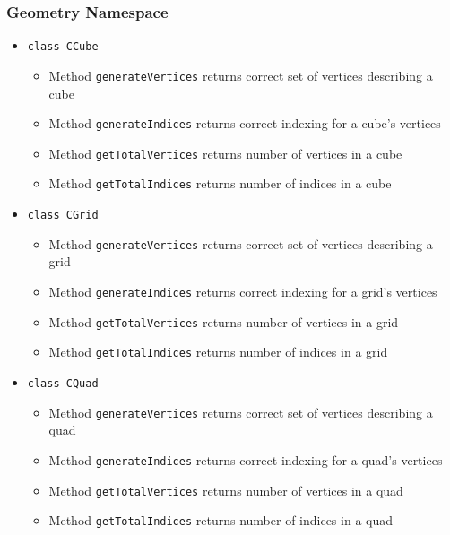 \documentclass{report}
\begin{document}
\subsubsection{Geometry Namespace}
\begin{itemize}

%
%	
\item \texttt{class CCube}
		\begin{itemize}
			\item Method \texttt{generateVertices} returns correct set of vertices describing a cube
			\item Method \texttt{generateIndices} returns correct indexing for a cube's vertices
			\item Method \texttt{getTotalVertices} returns number of vertices in a cube
			\item Method \texttt{getTotalIndices} returns number of indices in a cube
		\end{itemize}


%
%	
\item \texttt{class CGrid}
		\begin{itemize}
			\item Method \texttt{generateVertices} returns correct set of vertices describing a grid
			\item Method \texttt{generateIndices} returns correct indexing for a grid's vertices
			\item Method \texttt{getTotalVertices} returns number of vertices in a grid
			\item Method \texttt{getTotalIndices} returns number of indices in a grid
		\end{itemize}
		
		
%
%	
\item \texttt{class CQuad}
		\begin{itemize}
			\item Method \texttt{generateVertices} returns correct set of vertices describing a quad
			\item Method \texttt{generateIndices} returns correct indexing for a quad's vertices
			\item Method \texttt{getTotalVertices} returns number of vertices in a quad
			\item Method \texttt{getTotalIndices} returns number of indices in a quad
		\end{itemize}


\end{itemize}
\end{document}

